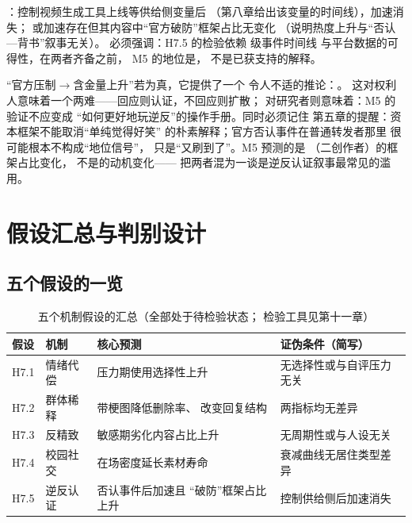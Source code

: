 ：控制视频生成工具上线等供给侧变量后
（第八章给出该变量的时间线），加速消失；
或加速存在但其内容中“官方破防”框架占比无变化
（说明热度上升与“否认—背书”叙事无关）。
必须强调：H7.5 的检验依赖  级事件时间线
与平台数据的可得性，在两者齐备之前，
M5 的地位是，
不是已获支持的解释。

\begin{nlcritique}
  “官方压制$\to$含金量上升”若为真，它提供了一个
  令人不适的推论：。
  这对权利人意味着一个两难——回应则认证，不回应则扩散；
  对研究者则意味着：M5 的验证不应变成
  “如何更好地玩逆反”的操作手册。同时必须记住
  第五章的提醒：资本框架不能取消“单纯觉得好笑”
  的朴素解释；官方否认事件在普通转发者那里
  很可能根本不构成“地位信号”，
  只是“又刷到了”。M5 预测的是
  （二创作者）的框架占比变化，
  不是的动机变化——
  把两者混为一谈是逆反认证叙事最常见的滥用。
\end{nlcritique}

\section{假设汇总与判别设计}\label{sec:07:compete}

\subsection{五个假设的一览}

\begin{table}[htbp]\centering
  \caption{五个机制假设的汇总（全部处于待检验状态；
          检验工具见第十一章）}
  \label{tab:07:hyps}
  \small
  \begin{tabularx}{\textwidth}{@{}llXX@{}}
    \toprule
    假设 & 机制 & 核心预测 & 证伪条件（简写） \\ \midrule
    H7.1 & 情绪代偿 & 压力期使用选择性上升 &
      无选择性或与自评压力无关 \\
    H7.2 & 群体稀释 & 带梗图降低删除率、
      改变回复结构 & 两指标均无差异 \\
    H7.3 & 反精致 & 敏感期劣化内容占比上升 &
      无周期性或与人设无关 \\
    H7.4 & 校园社交 & 在场密度延长素材寿命 &
      衰减曲线无居住类型差异 \\
    H7.5 & 逆反认证 & 否认事件后加速且
      “破防”框架占比上升 & 控制供给侧后加速消失 \\
    \bottomrule
  \end{tabularx}
\end{table}

